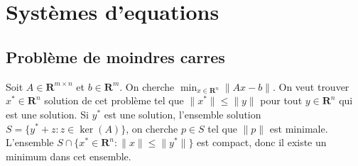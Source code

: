 \section{Systèmes d'equations}
\subsection{Problème de moindres carres}
Soit $A\in \mathbf{R}^{m\times n}$ et $b\in \mathbf{R}^{m}$. On cherche $\min_{x \in \mathbf{R}^{n}}\lVert Ax-b \rVert$. On veut trouver $x^{*}\in \mathbf{R}^{n}$ solution de cet problème tel que $\lVert x^{*} \rVert\le \lVert y \rVert$ pour tout $y\in \mathbf{R}^{n}$ qui est une solution. Si $y^{*}$ est une solution, l'ensemble solution $S=\{ y^{*}+z:z\in \ker(A) \}$, on cherche $p \in S$ tel que $\lVert p \rVert$ est minimale. L'ensemble $S\cap \{ x^{*}\in \mathbf{R}^{n}:\lVert x \rVert\le\lVert y^{*} \rVert \}$ est compact, donc il existe un minimum dans cet ensemble.

